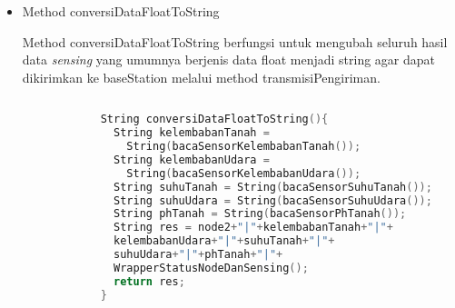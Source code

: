 \begin{itemize}
\begin{itemize}
            \item Method conversiDataFloatToString
            
            Method conversiDataFloatToString berfungsi untuk mengubah seluruh hasil data \textit{sensing} yang umumnya berjenis data float menjadi string agar dapat dikirimkan ke baseStation melalui method transmisiPengiriman.
            
            \begin{lstlisting}[label=conversiDataFloatToString, language=C, caption=Metode conversiDataFloatToString(), numbers=none]
            
            String conversiDataFloatToString(){
              String kelembabanTanah =
                String(bacaSensorKelembabanTanah());
              String kelembabanUdara =
                String(bacaSensorKelembabanUdara());
              String suhuTanah = String(bacaSensorSuhuTanah());
              String suhuUdara = String(bacaSensorSuhuUdara());
              String phTanah = String(bacaSensorPhTanah());
              String res = node2+"|"+kelembabanTanah+"|"+
              kelembabanUdara+"|"+suhuTanah+"|"+
              suhuUdara+"|"+phTanah+"|"+
              WrapperStatusNodeDanSensing();
              return res;
            }
            
            \end{lstlisting}
            
            
            
            
              
            
            

\end{itemize}
\end{itemize}
